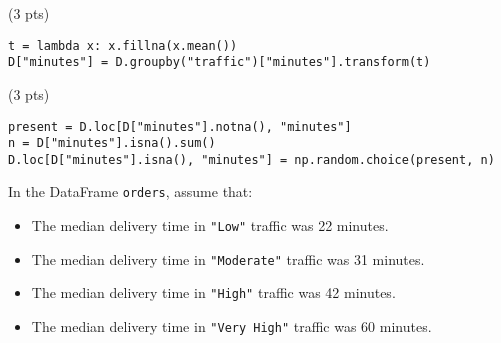 \documentclass[twoside,12pt]{article}
\begin{document}
\begin{probset}
\begin{prob}[(9 pts)]
\begin{subprobset}
\begin{subprob}(3 pts)

\begin{verbatim}
t = lambda x: x.fillna(x.mean())
D["minutes"] = D.groupby("traffic")["minutes"].transform(t)
\end{verbatim}





\end{subprob}

\vspace{0.2in}

\begin{subprob}(3 pts)

\begin{verbatim}
present = D.loc[D["minutes"].notna(), "minutes"]
n = D["minutes"].isna().sum()
D.loc[D["minutes"].isna(), "minutes"] = np.random.choice(present, n)
\end{verbatim}





\end{subprob}

\end{subprobset}

\end{prob}

\newpage

\begin{prob}[(4 pts)]

In the DataFrame \texttt{orders}, assume that:

\begin{itemize}
    \item The median delivery time in \texttt{"Low"} traffic was 22 minutes.
    \item The median delivery time in \texttt{"Moderate"} traffic was 31 minutes.
    \item The median delivery time in \texttt{"High"} traffic was 42 minutes.
    \item The median delivery time in \texttt{"Very High"} traffic was 60 minutes.
\end{itemize}


\end{prob}
\end{probset}
\end{document}
